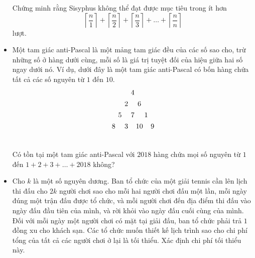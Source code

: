 \documentclass[11pt]{scrartcl}
\begin{document}
\begin{itemize}[label=, leftmargin=0em, itemsep=-0em]
\begin{btvn}
        Chứng minh rằng Sisyphus không thể đạt được mục tiêu trong ít hơn
        \[ \left \lceil \frac{n}{1} \right \rceil + \left \lceil \frac{n}{2} \right \rceil + \left \lceil \frac{n}{3} \right \rceil + \dots + \left \lceil \frac{n}{n} \right \rceil \]
        lượt.
    \end{btvn}

    \item \begin{btvn}
        Một tam giác anti-Pascal là một mảng tam giác đều của các số sao cho, trừ những số ở hàng dưới cùng, mỗi số là giá trị tuyệt đối của hiệu giữa hai số ngay dưới nó. Ví dụ, dưới đây là một tam giác anti-Pascal có bốn hàng chứa tất cả các số nguyên từ $1$ đến $10$.
        \[\begin{array}{
            c@{\hspace{4pt}}c@{\hspace{4pt}}
            c@{\hspace{4pt}}c@{\hspace{2pt}}c@{\hspace{2pt}}c@{\hspace{4pt}}c
            } \vspace{4pt}
            & & & 4 & & & \\\vspace{4pt}
            & & 2 & & 6 & & \\\vspace{4pt}
            & 5 & & 7 & & 1 & \\\vspace{4pt}
            8 & & 3 & & 10 & & 9 \\\vspace{4pt}
            \end{array}\]
            Có tồn tại một tam giác  anti-Pascal với $2018$ hàng chứa mọi số nguyên từ $1$ đến $1 + 2 + 3 + \dots + 2018$ không?
    \end{btvn}

    \item \begin{btvn}
        Cho $k$ là một số nguyên dương. Ban tổ chức của một giải tennis cần lên lịch thi đấu cho $2k$ người chơi sao cho mỗi hai người chơi đấu một lần, mỗi ngày đúng một trận đấu được tổ chức, và mỗi người chơi đến địa điểm thi đấu vào ngày đấu đầu tiên của mình, và rời khỏi vào ngày đấu cuối cùng của mình. Đối với mỗi ngày một người chơi có mặt tại giải đấu, ban tổ chức phải trả $1$ đồng xu cho khách sạn. Các tổ chức muốn thiết kế lịch trình sao cho chi phí tổng của tất cả các người chơi ở lại là tối thiểu. Xác định chi phí tối thiểu này.
    \end{btvn}


\end{itemize}
\end{document}
